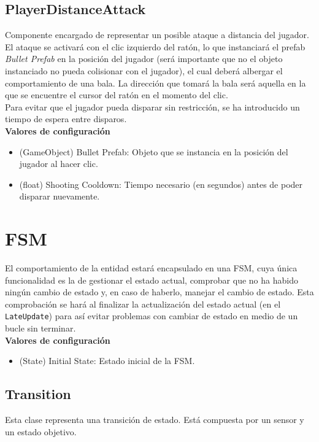 \subsection{PlayerDistanceAttack}

Componente encargado de representar un posible ataque a distancia del jugador. El ataque se activará con el clic izquierdo del ratón, lo que instanciará el prefab \textit{Bullet Prefab} en la posición del jugador (será importante que no el objeto instanciado no pueda colisionar con el jugador), el cual deberá albergar el comportamiento de una bala. La dirección que tomará la bala será aquella en la que se encuentre el cursor del ratón en el momento del clic.\\

Para evitar que el jugador pueda disparar sin restricción, se ha introducido un tiempo de espera entre disparos.\\

\textbf{Valores de configuración}
\begin{itemize}
	\item (GameObject) Bullet Prefab: Objeto que se instancia en la posición del jugador al hacer clic.
	\item (float) Shooting Cooldown: Tiempo necesario (en segundos) antes de poder disparar nuevamente.
\end{itemize}

\section {FSM}

El comportamiento de la entidad estará encapsulado en una FSM, cuya única funcionalidad es la de gestionar el estado actual, comprobar que no ha habido ningún cambio de estado y, en caso de haberlo, manejar el cambio de estado. Esta comprobación se hará al finalizar la actualización del estado actual (en el \texttt{LateUpdate}) para así evitar problemas con cambiar de estado en medio de un bucle sin terminar.\\

\textbf{Valores de configuración}
\begin{itemize}
	\item (State) Initial State: Estado inicial de la FSM.
\end{itemize}

\subsection{Transition}
Esta clase representa una transición de estado. Está compuesta por un sensor y un estado objetivo.\\

